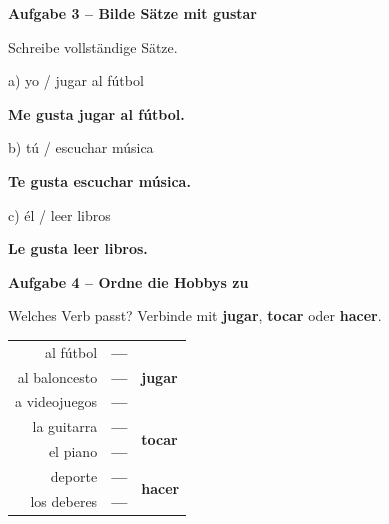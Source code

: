 \documentclass[11pt, a4paper]{article}
\newcommand{\fachfarbe}{spanisch}
\newcommand{\punktebox}[1]{\hfill\fbox{\small \_/#1}}
\newcommand{\lsg}[1]{\textcolor{loesung}{\textbf{#1}}}
\newenvironment{aufgabe}[1]{%
    \needspace{5\baselineskip}%
    \nopagebreak[4]%
    \vspace{10pt}
    \noindent\textbf{\textcolor{\fachfarbe}{Aufgabe #1}}
    \nopagebreak[4]%
    \vspace{5pt}
    \nopagebreak[4]%
    \begin{list}{}{\leftmargin=0pt}
    \item[]
}{%
    \end{list}
}
\newcommand{\es}[1]{\textcolor{\fachfarbe}{\textbf{#1}}}
\begin{document}
\vspace{10pt}


\begin{aufgabe}{3 -- Bilde Sätze mit gustar}
Schreibe vollständige Sätze. \punktebox{6}
\end{aufgabe}

\noindent
a) yo / jugar al fútbol

\vspace{0.5em}
\noindent
\lsg{Me gusta jugar al fútbol.}

\vspace{0.8em}

\noindent
b) tú / escuchar música

\vspace{0.5em}
\noindent
\lsg{Te gusta escuchar música.}

\vspace{0.8em}

\noindent
c) él / leer libros

\vspace{0.5em}
\noindent
\lsg{Le gusta leer libros.}

\vspace{10pt}


\begin{aufgabe}{4 -- Ordne die Hobbys zu}
Welches Verb passt? Verbinde mit \es{jugar}, \es{tocar} oder \es{hacer}. \punktebox{6}
\end{aufgabe}

\begin{center}
\begin{tabular}{rcl}
al fútbol & \lsg{---} & \multirow{3}{*}{\es{jugar}} \\
al baloncesto & \lsg{---} & \\
a videojuegos & \lsg{---} & \\[0.8em]
la guitarra & \lsg{---} & \multirow{2}{*}{\es{tocar}} \\
el piano & \lsg{---} & \\[0.8em]
deporte & \lsg{---} & \multirow{2}{*}{\es{hacer}} \\
los deberes & \lsg{---} & \\
\end{tabular}
\end{center}
\end{document}
